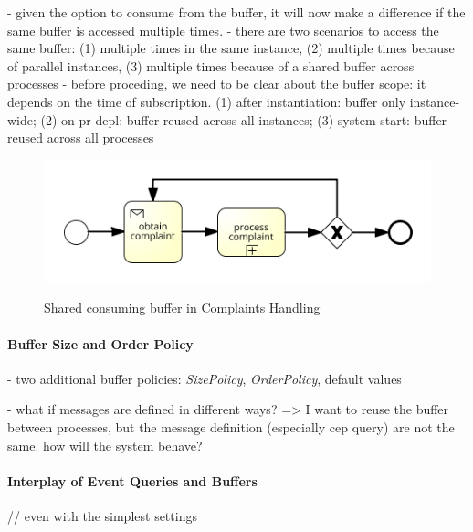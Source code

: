 - given the option to consume from the buffer, it will now make a difference if the same buffer is accessed multiple times.
- there are two scenarios to access the same buffer: (1) multiple times in the same instance, (2) multiple times because of parallel instances, (3) multiple times because of a shared buffer across processes
- before proceding, we need to be clear about the buffer scope: it depends on the time of subscription. (1) after instantiation: buffer only instance-wide; (2) on pr depl: buffer reused across all instances; (3) system start: buffer reused across all processes

\begin{figure}[]
	\myfloatalign
	{\includegraphics[width=1\linewidth]{chapters/concept/bpmnx/ComplaintProcessing.png}}
	\caption{Shared consuming buffer in Complaints Handling}\label{fig:example-complaints}
\end{figure}

\paragraph{Buffer Size and Order Policy\newline}

- two additional buffer policies: \textit{SizePolicy}, \textit{OrderPolicy}, default values

- what if messages are defined in different ways? => I want to reuse the buffer between processes, but the message definition (especially cep query) are not the same. how will the system behave?

\paragraph{Interplay of Event Queries and Buffers}

// even with the simplest settings

